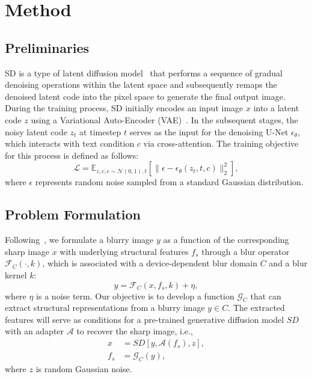 \section{Method}

\subsection{Preliminaries}

SD is a type of latent diffusion model~\cite{rombach2022high} that performs a sequence of gradual denoising operations within the latent space and subsequently remaps the denoised latent code into the pixel space to generate the final output image. During the training process, SD initially encodes an input image $x$ into a latent code $z$ using a Variational Auto-Encoder (VAE)~\cite{kingma2013auto}. In the subsequent stages, the noisy latent code $z_t$ at timestep $t$ serves as the input for the denoising U-Net $\epsilon_\theta$, which interacts with text condition $c$ via cross-attention. The training objective for this process is defined as follows:
\begin{equation}
\label{eq:diffusion loss}
\mathcal{L} = \mathbb{E}_{z,c,\epsilon \sim \mathcal{N}(0,1),t} \left[ \| \epsilon - \epsilon_\theta (z_t, t, c) \|_2^2 \right],
\end{equation}
where $\epsilon$ represents random noise sampled from a standard Gaussian distribution.



\subsection{Problem Formulation}

Following~\cite{pham2024blur2blur}, we formulate a blurry image $y$ as a function of the corresponding sharp image $x$ with underlying structural features $f_{s}$ through a blur operator $\mathcal{F}_C(\cdot, k)$, which is associated with a device-dependent blur domain $C$ and a blur kernel $k$:
\begin{equation}
    y = \mathcal{F}_C(x, f_{s}, k) + \eta,
\end{equation}
where $\eta$ is a noise term. Our objective is to develop a function $\mathcal{G}_C$ that can extract structural representations from a blurry image $y \in C$. The extracted features will serve as conditions for a pre-trained generative diffusion model $SD$ with an adapter $\mathcal{A}$ to recover the sharp image, i.e.,
\begin{equation}
\begin{aligned}
    x &= SD\left[y, \mathcal{A}(f_{s}), z\right], \\
    f_{s} &= \mathcal{G}_C(y),
\end{aligned}
\end{equation}
where $z$ is random Gaussian noise.


